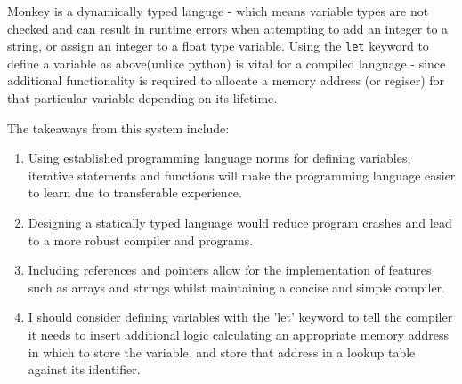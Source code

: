 Monkey is a dynamically typed languge - which means variable types are not checked and can result in runtime errors when attempting to add an integer to a string, or assign an integer to a float type variable. Using the \texttt{let} keyword to define a variable as above(unlike python) is vital for a compiled language - since additional functionality is required to allocate a memory address (or regiser) for that particular variable depending on its lifetime.

The takeaways from this system include:
\begin{enumerate}
    \item Using established programming language norms for defining variables, iterative statements and functions will make the programming language easier to learn due to transferable experience.
    \item Designing a statically typed language would reduce program crashes and lead to a more robust compiler and programs.
    \item Including references and pointers allow for the implementation of features such as arrays and strings whilst maintaining a concise and simple compiler.
    \item I should consider defining variables with the 'let' keyword to tell the compiler it needs to insert additional logic calculating an appropriate memory address in which to store the variable, and store that address in a lookup table against its identifier.
\end{enumerate}

